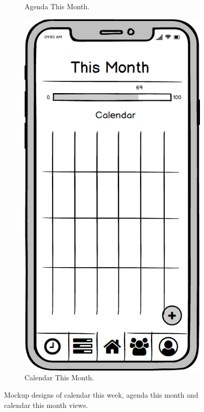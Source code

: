 \begin{figure}
\begin{subfigure}[b]{0.3\textwidth}
        \caption{Agenda This Month.}
        \label{fig:agenda_this_month}
    \end{subfigure}
    \hfill
    \begin{subfigure}[b]{0.3\textwidth}
        \centering
        \includegraphics[width=\textwidth]{./graphics/design/Dashboard (This Month Calendar View).png}
        \caption{Calendar This Month.}
        \label{fig:this_month_calendar}
    \end{subfigure}
    
    \caption{Mockup designs of calendar this week, agenda this month and calendar this month views.}
    \label{fig:calthisweek_agendathismonth_calthismonth}
\end{figure}


